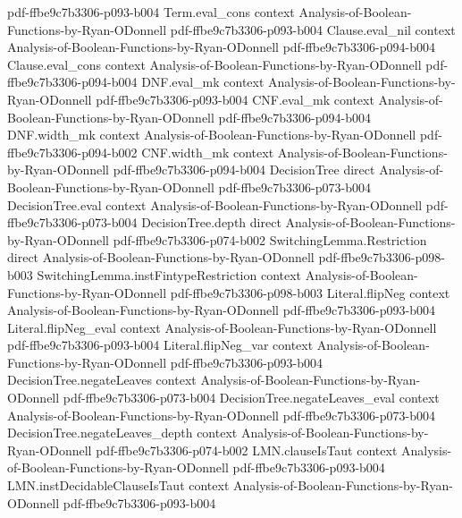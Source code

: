 \begin{lemma}
  {pdf-ffbe9c7b3306-p093-b004}
\proofstep
  {Term.eval_cons}
  {context}
  {Analysis-of-Boolean-Functions-by-Ryan-ODonnell}
  {pdf-ffbe9c7b3306-p093-b004}
\proofstep
  {Clause.eval_nil}
  {context}
  {Analysis-of-Boolean-Functions-by-Ryan-ODonnell}
  {pdf-ffbe9c7b3306-p094-b004}
\proofstep
  {Clause.eval_cons}
  {context}
  {Analysis-of-Boolean-Functions-by-Ryan-ODonnell}
  {pdf-ffbe9c7b3306-p094-b004}
\proofstep
  {DNF.eval_mk}
  {context}
  {Analysis-of-Boolean-Functions-by-Ryan-ODonnell}
  {pdf-ffbe9c7b3306-p093-b004}
\proofstep
  {CNF.eval_mk}
  {context}
  {Analysis-of-Boolean-Functions-by-Ryan-ODonnell}
  {pdf-ffbe9c7b3306-p094-b004}
\proofstep
  {DNF.width_mk}
  {context}
  {Analysis-of-Boolean-Functions-by-Ryan-ODonnell}
  {pdf-ffbe9c7b3306-p094-b002}
\proofstep
  {CNF.width_mk}
  {context}
  {Analysis-of-Boolean-Functions-by-Ryan-ODonnell}
  {pdf-ffbe9c7b3306-p094-b004}
\proofstep
  {DecisionTree}
  {direct}
  {Analysis-of-Boolean-Functions-by-Ryan-ODonnell}
  {pdf-ffbe9c7b3306-p073-b004}
\proofstep
  {DecisionTree.eval}
  {context}
  {Analysis-of-Boolean-Functions-by-Ryan-ODonnell}
  {pdf-ffbe9c7b3306-p073-b004}
\proofstep
  {DecisionTree.depth}
  {direct}
  {Analysis-of-Boolean-Functions-by-Ryan-ODonnell}
  {pdf-ffbe9c7b3306-p074-b002}
\proofstep
  {SwitchingLemma.Restriction}
  {direct}
  {Analysis-of-Boolean-Functions-by-Ryan-ODonnell}
  {pdf-ffbe9c7b3306-p098-b003}
\proofstep
  {SwitchingLemma.instFintypeRestriction}
  {context}
  {Analysis-of-Boolean-Functions-by-Ryan-ODonnell}
  {pdf-ffbe9c7b3306-p098-b003}
\proofstep
  {Literal.flipNeg}
  {context}
  {Analysis-of-Boolean-Functions-by-Ryan-ODonnell}
  {pdf-ffbe9c7b3306-p093-b004}
\proofstep
  {Literal.flipNeg_eval}
  {context}
  {Analysis-of-Boolean-Functions-by-Ryan-ODonnell}
  {pdf-ffbe9c7b3306-p093-b004}
\proofstep
  {Literal.flipNeg_var}
  {context}
  {Analysis-of-Boolean-Functions-by-Ryan-ODonnell}
  {pdf-ffbe9c7b3306-p093-b004}
\proofstep
  {DecisionTree.negateLeaves}
  {context}
  {Analysis-of-Boolean-Functions-by-Ryan-ODonnell}
  {pdf-ffbe9c7b3306-p073-b004}
\proofstep
  {DecisionTree.negateLeaves_eval}
  {context}
  {Analysis-of-Boolean-Functions-by-Ryan-ODonnell}
  {pdf-ffbe9c7b3306-p073-b004}
\proofstep
  {DecisionTree.negateLeaves_depth}
  {context}
  {Analysis-of-Boolean-Functions-by-Ryan-ODonnell}
  {pdf-ffbe9c7b3306-p074-b002}
\proofstep
  {LMN.clauseIsTaut}
  {context}
  {Analysis-of-Boolean-Functions-by-Ryan-ODonnell}
  {pdf-ffbe9c7b3306-p093-b004}
\proofstep
  {LMN.instDecidableClauseIsTaut}
  {context}
  {Analysis-of-Boolean-Functions-by-Ryan-ODonnell}
  {pdf-ffbe9c7b3306-p093-b004}

\end{lemma}
